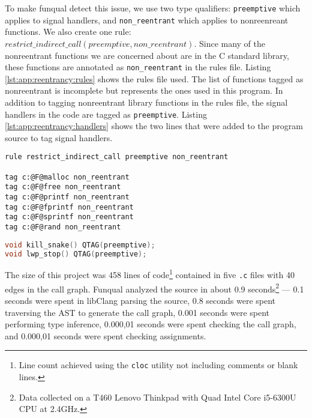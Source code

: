 To make funqual detect this issue, we use two type qualifiers: \lstinline{preemptive} which applies to signal handlers, and \lstinline{non_reentrant} which applies to nonreenreant functions.  We also create one rule: $restrict\_indirect\_call(preemptive, non\_reentrant)$.  Since many of the nonreentrant functions we are concerned about are in the C standard library, these functions are annotated as \lstinline{non_reentrant} in the rules file.  Listing \ref{lst:app:reentrancy:rules} shows the rules file used.  The list of functions tagged as nonreentrant is incomplete but represents the ones used in this program.  In addition to tagging nonreentrant library functions in the rules file, the signal handlers in the code are tagged as \lstinline{preemptive}.  Listing \ref{lst:app:reentrancy:handlers} shows the two lines that were added to the program source to tag signal handlers.  

\noindent\begin{minipage}[t]{\linewidth}
\begin{lstlisting}[caption={Rules file for preventing preemptive functions from calling non\_reentrant functions.  Since this rules file contains no references to project-specific functions, the file could concievably be re-used by several projects.},label={lst:app:reentrancy:rules}]
rule restrict_indirect_call preemptive non_reentrant

tag c:@F@malloc non_reentrant
tag c:@F@free non_reentrant
tag c:@F@printf non_reentrant
tag c:@F@fprintf non_reentrant
tag c:@F@sprintf non_reentrant
tag c:@F@rand non_reentrant
\end{lstlisting}
\end{minipage}

\noindent\begin{minipage}[t]{\linewidth}
\begin{lstlisting}[language=c,caption={Lines inserted into C file to mark signal handlers as preemptive.},label={lst:app:reentrancy:handlers}]
void kill_snake() QTAG(preemptive);
void lwp_stop() QTAG(preemptive);
\end{lstlisting}
\end{minipage}

The size of this project was 458 lines of code\footnote{Line count achieved using the \lstinline{cloc} utility not including comments or blank lines.} contained in five \lstinline{.c} files with 40 edges in the call graph.  Funqual analyzed the source in about 0.9 seconds\footnote{Data collected on a T460 Lenovo Thinkpad with Quad Intel Core i5-6300U CPU at 2.4GHz.} --- 0.1 seconds were spent in libClang parsing the source, 0.8 seconds were spent traversing the AST to generate the call graph, 0.001 seconds were spent performing type inference, 0.000,01 seconds were spent checking the call graph, and 0.000,01 seconds were spent checking assignments. 

